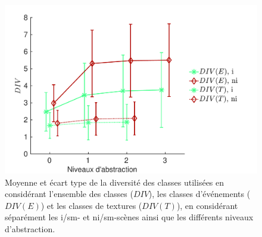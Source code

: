 
\begin{figure}[t]
        \myfloatalign
        \includegraphics[width=.8\linewidth]{gfx/ch_5/xp4_div_1}
        \caption{Moyenne et écart type de la diversité des classes utilisées en considérant l'ensemble des classes ($DIV$), les classes d'événements ($DIV(E)$) et les classes de textures ($DIV(T)$), en considérant séparément les i/sm- et ni/sm-scènes ainsi que les différents niveaux d'abstraction.}\label{fig:diversitySansMarker}
\end{figure}

